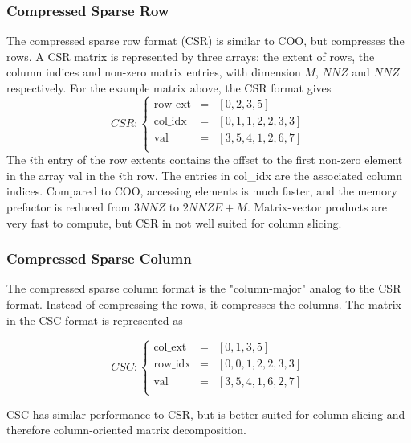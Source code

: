 \subsubsection{Compressed Sparse Row}

The compressed sparse row format (CSR) is similar to COO, but compresses the rows. A CSR matrix is represented by three arrays: the extent of rows, the column indices and non-zero matrix entries, with dimension $M$, $NNZ$ and $NNZ$ respectively. For the example matrix above, the CSR format gives
\begin{equation*}
CSR: \left\lbrace
\begin{array}{lll}
\textrm{row\_ext} &= &\left[ 0, 2, 3, 5 \right] \\
\textrm{col\_idx} &= &\left[ 0, 1, 1, 2, 2, 3, 3 \right] \\
\textrm{val}  &= &\left[ 3, 5, 4, 1, 2, 6, 7 \right] \\
\end{array}
\right.
\end{equation*}
\noindent The $i$th entry of the row extents contains the offset to the first non-zero element in the array \textrm{val} in the $i$th row. The entries in \textrm{col\_idx} are the associated column indices. Compared to COO, accessing elements is much faster, and the memory prefactor is reduced from $3NNZ$ to $2NNZE+M$. Matrix-vector products are very fast to compute, but CSR in not well suited for column slicing.

\subsubsection{Compressed Sparse Column}

The compressed sparse column format is the "column-major" analog to the CSR format. Instead of compressing the rows, it compresses the columns. The matrix in the CSC format is represented as

\begin{equation*}
CSC: \left\lbrace
\begin{array}{lll}
\textrm{col\_ext} &= &\left[ 0, 1, 3, 5 \right] \\
\textrm{row\_idx} &= &\left[ 0, 0, 1, 2, 2, 3, 3 \right] \\
\textrm{val}  &= &\left[ 3, 5, 4, 1, 6, 2, 7 \right] \\
\end{array}
\right.
\end{equation*}

CSC has similar performance to CSR, but is better suited for column slicing and therefore column-oriented matrix decomposition.

